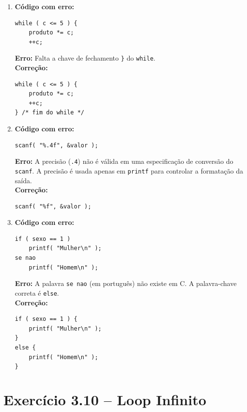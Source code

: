 \documentclass[12pt,a4paper]{article}
\begin{document}
\begin{respostabox}
\begin{enumerate}[label=\textbf{\alph*)}]

\item \textbf{Código com erro:}
\begin{lstlisting}
while ( c <= 5 ) {
    produto *= c;
    ++c;
\end{lstlisting}
\textbf{Erro:} Falta a chave de fechamento \texttt{\}} do \texttt{while}.\\
\textbf{Correção:}
\begin{lstlisting}
while ( c <= 5 ) {
    produto *= c;
    ++c;
} /* fim do while */
\end{lstlisting}

\item \textbf{Código com erro:}
\begin{lstlisting}
scanf( "%.4f", &valor );
\end{lstlisting}
\textbf{Erro:} A precisão (\texttt{.4}) não é válida em uma especificação de conversão
do \texttt{scanf}. A precisão é usada apenas em \texttt{printf} para controlar a
formatação da saída.\\
\textbf{Correção:}
\begin{lstlisting}
scanf( "%f", &valor );
\end{lstlisting}

\item \textbf{Código com erro:}
\begin{lstlisting}
if ( sexo == 1 )
    printf( "Mulher\n" );
se nao
    printf( "Homem\n" );
\end{lstlisting}
\textbf{Erro:} A palavra \texttt{se nao} (em português) não existe em C. A palavra-chave
correta é \texttt{else}.\\
\textbf{Correção:}
\begin{lstlisting}
if ( sexo == 1 ) {
    printf( "Mulher\n" );
}
else {
    printf( "Homem\n" );
}
\end{lstlisting}

\end{enumerate}
\end{respostabox}

\section{Exercício 3.10 -- Loop Infinito}
\end{document}
